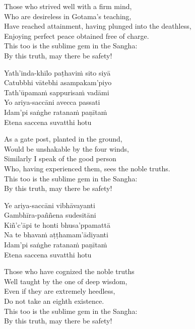\begin{english-verses}
  Those who strived well with a firm mind,\\
  Who are desireless in Gotama's teaching,\\
  Have reached attainment, having plunged into the deathless,\\
  Enjoying perfect peace obtained free of charge.\\
  This too is the sublime gem in the Sangha:\\
  By this truth, may there be safety!
\end{english-verses}

\begin{pali-hang-continued}
  Yath'inda-khīlo paṭhaviṁ sito siyā\\
  Catubbhi vātebhi asampakam'piyo\\
  Tath'ūpamaṁ sappurisaṁ vadāmi\\
  Yo ariya-saccāni avecca passati\\
  Idam'pi saṅghe ratanaṁ paṇītaṁ\\
  Etena saccena suvatthi hotu
\end{pali-hang-continued}

\begin{english-verses}
  As a gate post, planted in the ground,\\
  Would be unshakable by the four winds,\\
  Similarly I speak of the good person\\
  Who, having experienced them, sees the noble truths.\\
  This too is the sublime gem in the Sangha:\\
  By this truth, may there be safety!
\end{english-verses}

\begin{pali-hang-continued}
  Ye ariya-saccāni vibhāvayanti\\
  Gambhīra-paññena sudesitāni\\
  Kiñ'c'āpi te honti bhusa'ppamattā\\
  Na te bhavaṁ aṭṭhamam'ādiyanti\\
  Idam'pi saṅghe ratanaṁ paṇītaṁ\\
  Etena saccena suvatthi hotu
\end{pali-hang-continued}

\begin{english-verses}
  Those who have cognized the noble truths\\
  Well taught by the one of deep wisdom,\\
  Even if they are extremely heedless,\\
  Do not take an eighth existence.\\
  This too is the sublime gem in the Sangha:\\
  By this truth, may there be safety!
\end{english-verses}

